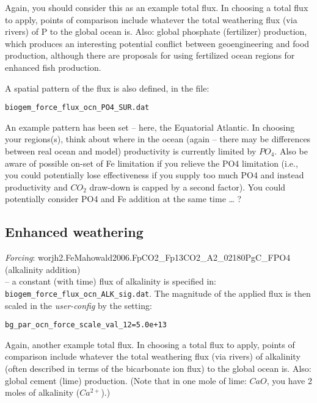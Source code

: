 \documentclass[11pt,fleqn]{book} %
\begin{document}
Again, you should consider this as an example total flux. In choosing a total flux to apply, points of comparison include whatever the total weathering flux (via rivers) of P to the global ocean is. Also: global phosphate (fertilizer) production, which produces an interesting potential conflict between geoengineering and food production, although there are proposals for using fertilized ocean regions for enhanced fish production. 

A spatial pattern of the flux is also defined, in the file:
\vspace{-2pt}\small\begin{verbatim}
biogem_force_flux_ocn_PO4_SUR.dat
\end{verbatim}\normalsize\vspace{-2pt}

An example pattern has been set – here, the Equatorial Atlantic. In choosing your regions(s), think about where in the ocean (again – there may be differences between real ocean and model) productivity is currently limited by \(PO_{4}\). Also be aware of possible on-set of Fe limitation if you relieve the PO4 limitation (i.e., you could potentially lose effectiveness if you supply too much PO4 and instead productivity and \(CO_{2}\) draw-down is capped by a second factor). You could potentially consider PO4 and Fe addition at the same time … ?


\subsection{Enhanced weathering}

\textit{Forcing}: \textsf{\footnotesize worjh2.FeMahowald2006.FpCO2\_Fp13CO2\_A2\_02180PgC\_FPO4} (alkalinity addition)
\vspace{1pt}
\\ -- a constant (with time) flux of alkalinity is specified in: \texttt{biogem\_force\_flux\_ocn\_ALK\_sig.dat}. The magnitude of the applied flux is then scaled in the \textit{user-config} by the setting:
\vspace{-2pt}\small\begin{verbatim}
bg_par_ocn_force_scale_val_12=5.0e+13
\end{verbatim}\normalsize\vspace{-2pt}

Again, another example total flux. In choosing a total flux to apply, points of comparison include whatever the total weathering flux (via rivers) of alkalinity (often described in terms of the bicarbonate ion flux) to the global ocean is. Also: global cement (lime) production. (Note that in one mole of lime: \(CaO\), you have 2 moles of alkalinity (\(Ca^{2+}\)).) 
\end{document}
